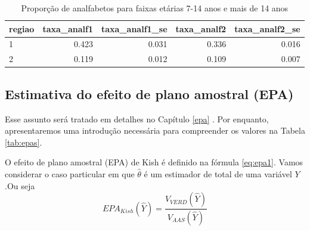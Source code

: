 \documentclass[]{book}
\newenvironment{Shaded}{\begin{snugshade}}{\end{snugshade}}
\newcommand{\KeywordTok}[1]{\textcolor[rgb]{0.13,0.29,0.53}{\textbf{#1}}}
\newcommand{\DataTypeTok}[1]{\textcolor[rgb]{0.13,0.29,0.53}{#1}}
\newcommand{\DecValTok}[1]{\textcolor[rgb]{0.00,0.00,0.81}{#1}}
\newcommand{\StringTok}[1]{\textcolor[rgb]{0.31,0.60,0.02}{#1}}
\newcommand{\OtherTok}[1]{\textcolor[rgb]{0.56,0.35,0.01}{#1}}
\newcommand{\OperatorTok}[1]{\textcolor[rgb]{0.81,0.36,0.00}{\textbf{#1}}}
\newcommand{\NormalTok}[1]{#1}
\theoremstyle{definition}
\theoremstyle{definition}
\theoremstyle{definition}
\theoremstyle{remark}
\begin{document}
\begin{Shaded}
\end{Shaded}

\begin{table}

\caption{\label{tab:unnamed-chunk-11}Proporção de analfabetos para faixas etárias 7-14 anos e mais de 14 anos}
\centering
\begin{tabular}[t]{lrrrr}
\toprule
regiao & taxa\_analf1 & taxa\_analf1\_se & taxa\_analf2 & taxa\_analf2\_se\\
\midrule
1 & 0.423 & 0.031 & 0.336 & 0.016\\
2 & 0.119 & 0.012 & 0.109 & 0.007\\
\bottomrule
\end{tabular}
\end{table}

\subsection{Estimativa do efeito de plano amostral
(EPA)}\label{estimativa-do-efeito-de-plano-amostral-epa}

Esse assunto será tratado em detalhes no Capítulo \ref{epa} . Por
enquanto, apresentaremos uma introdução necessária para compreender os
valores na Tabela \ref{tab:epas}.

O efeito de plano amostral (EPA) de Kish é definido na fórmula
\eqref{eq:epa1}. Vamos considerar o caso particular em que
\(\hat{\theta}\) é um estimador de total de uma variável \(Y\).Ou seja
\[
EPA_{Kish}\left(\widehat{Y}\right)=\frac{V_{VERD}\left(\widehat{Y}\right)}{V_{AAS}\left(\widehat{Y}\right)}
\]
\end{document}
